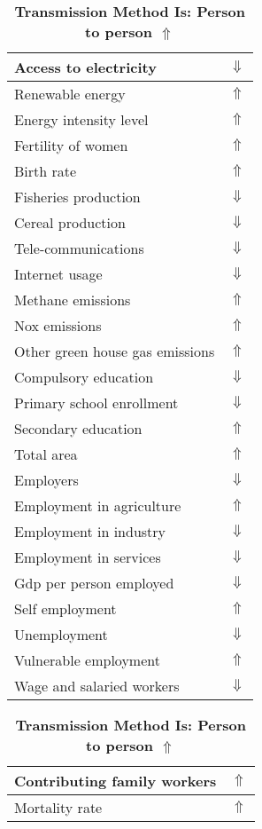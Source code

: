 \documentclass[12pt,notitlepage,oneside]{report}
\begin{document}
\begin{table}[!htb]
\caption{\textbf{Transmission Method Is: Person to person $\Uparrow$}}
\centering
\label{Correlated Socio-economic Factors0}
\begin{tabular}{|l|l|}
\hline
Access to electricity & $\Downarrow$\\ \hline
Renewable energy & $\Uparrow$\\ \hline
Energy intensity level & $\Uparrow$\\ \hline
Fertility of women & $\Uparrow$\\ \hline
Birth rate & $\Uparrow$\\ \hline
Fisheries production & $\Downarrow$\\ \hline
Cereal production & $\Downarrow$\\ \hline
Tele-communications & $\Downarrow$\\ \hline
Internet usage & $\Downarrow$\\ \hline
Methane emissions & $\Uparrow$\\ \hline
Nox emissions & $\Uparrow$\\ \hline
Other green house gas emissions & $\Uparrow$\\ \hline
Compulsory education & $\Downarrow$\\ \hline
Primary school enrollment & $\Downarrow$\\ \hline
Secondary education & $\Uparrow$\\ \hline
Total area & $\Uparrow$\\ \hline
Employers & $\Downarrow$\\ \hline
Employment in agriculture & $\Uparrow$\\ \hline
Employment in industry & $\Downarrow$\\ \hline
Employment in services & $\Downarrow$\\ \hline
Gdp per person employed & $\Downarrow$\\ \hline
Self employment & $\Uparrow$\\ \hline
Unemployment & $\Downarrow$\\ \hline
Vulnerable employment & $\Uparrow$\\ \hline
Wage and salaried workers & $\Downarrow$\\ \hline
\end{tabular}
\begin{tabular}{|l|l|}
\hline
Contributing family workers & $\Uparrow$\\ \hline
Mortality rate & $\Uparrow$\\ \hline

\end{tabular}
\end{table}
\end{document}
